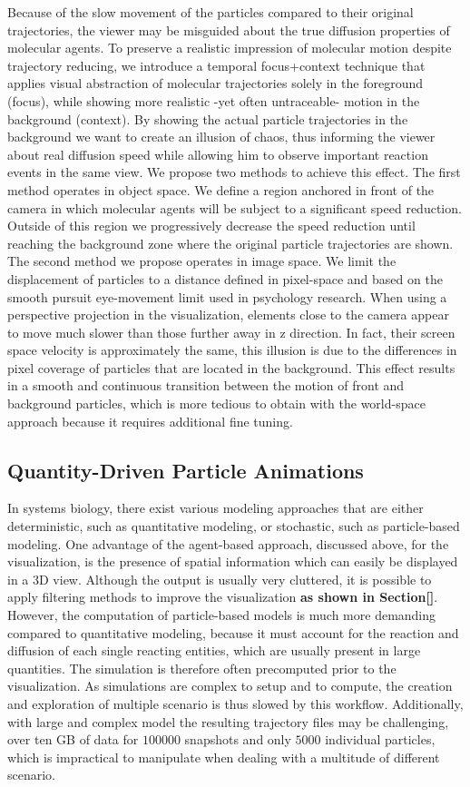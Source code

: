 Because of the slow movement of the particles compared to their original trajectories, the viewer may be misguided about the true diffusion properties of molecular agents.
To preserve a realistic impression of molecular motion despite trajectory reducing, we introduce a temporal focus+context technique that applies visual abstraction of molecular trajectories solely in the foreground (focus), while showing more realistic -yet often untraceable- motion in the background (context).
By showing the actual particle trajectories in the background we want to create an illusion of chaos, thus informing the viewer about real diffusion speed while allowing him to observe important reaction events in the same view.
We propose two methods to achieve this effect.
The first method operates in object space.
We define a region anchored in front of the camera in which molecular agents will be subject to a significant speed reduction.
Outside of this region we progressively decrease the speed reduction until reaching the background zone where the original particle trajectories are shown.
The second method we propose operates in image space.
We limit the displacement of particles to a distance defined in pixel-space and based on the smooth pursuit eye-movement limit used in psychology research.
When using a perspective projection in the visualization, elements close to the camera appear to move much slower than those further away in z direction. 
In fact, their screen space velocity is approximately the same, this illusion is due to the differences in pixel coverage of particles that are located in the background.
This effect results in a smooth and continuous transition between the motion of front and background particles, which is more tedious to obtain with the world-space approach because it requires additional fine tuning.

\subsection{Quantity-Driven Particle Animations}

In systems biology, there exist various modeling approaches that are either deterministic, such as quantitative modeling, or stochastic, such as particle-based modeling.
One advantage of the agent-based approach, discussed above, for the visualization, is the presence of spatial information which can easily be displayed in a 3D view.
Although the output is usually very cluttered, it is possible to apply filtering methods to improve the visualization\textbf{ as shown in Section[]}.
However, the computation of particle-based models is much more demanding compared to quantitative modeling, because it must account for the reaction and diffusion of each single reacting entities, which are usually present in large quantities.
The simulation is therefore often precomputed prior to the visualization.
As simulations are complex to setup and to compute, the creation and exploration of multiple scenario is thus slowed by this workflow.
Additionally, with large and complex model the resulting trajectory files may be challenging, over ten GB of data for $100000$ snapshots and only $5000$ individual particles, which is impractical to manipulate when dealing with a multitude of different scenario.

